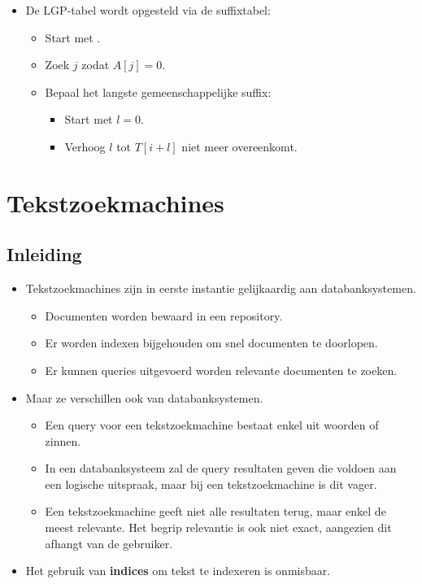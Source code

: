 \begin{itemize}
    \item De LGP-tabel wordt opgesteld via de suffixtabel:
    \begin{itemize}
        \item Start met .
        \item Zoek $j$ zodat $A[j] = 0$. 
        \item Bepaal het langste gemeenschappelijke suffix:
        \begin{itemize}
            \item Start met $l = 0$.
            \item Verhoog $l$ tot $T[i + l]$ niet meer overeenkomt.
        \end{itemize}
    \end{itemize}
    
\end{itemize}


\section{Tekstzoekmachines}
\subsection{Inleiding}
\begin{itemize}
    \item Tekstzoekmachines zijn in eerste instantie gelijkaardig aan databanksystemen.
    \begin{itemize}
        \item Documenten worden bewaard in een repository.
        \item Er worden indexen bijgehouden om snel documenten te doorlopen.
        \item Er kunnen queries uitgevoerd worden relevante documenten te zoeken.
    \end{itemize}
    \item Maar ze verschillen ook van databanksystemen.
    \begin{itemize}
        \item Een query voor een tekstzoekmachine bestaat enkel uit woorden of zinnen.
        \item In een databanksysteem zal de query resultaten geven die voldoen aan een logische uitspraak, maar bij een tekstzoekmachine is dit vager.
        \item Een tekstzoekmachine geeft niet alle resultaten terug, maar enkel de meest relevante. Het begrip relevantie is ook niet exact, aangezien dit afhangt van de gebruiker.
    \end{itemize}
    \item Het gebruik van \textbf{indices} om tekst te indexeren is onmisbaar.
\end{itemize}

